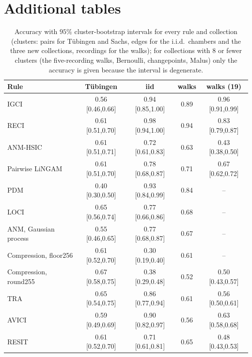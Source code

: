 \section{Additional tables}\label{app:tables}

\begin{table}[ht]
\caption{Accuracy with $95\%$ cluster-bootstrap intervals for every rule and collection (clusters: pairs for T\"ubingen and Sachs, edges for the i.i.d.\ chambers and the three new collections, recordings for the walks); for collections with $8$ or fewer clusters (the five-recording walks, Bernoulli, changepoints, Malus) only the accuracy is given because the interval is degenerate.}
\label{tab:collections_ci}
\scriptsize\setlength{\tabcolsep}{2pt}
\begin{tabular}{@{}lcccc@{}}
\toprule
Rule & T\"ubingen & iid & walks & walks (19)\\
\midrule
IGCI & 0.56 [0.46,0.66] & 0.94 [0.85,1.00] & 0.89 & 0.96 [0.91,0.99]\\
RECI & 0.61 [0.51,0.70] & 0.98 [0.94,1.00] & 0.94 & 0.83 [0.79,0.87]\\
ANM-HSIC & 0.61 [0.51,0.71] & 0.72 [0.61,0.83] & 0.63 & 0.43 [0.38,0.50]\\
Pairwise LiNGAM & 0.61 [0.51,0.70] & 0.78 [0.68,0.87] & 0.71 & 0.67 [0.62,0.72]\\
PDM & 0.40 [0.30,0.50] & 0.93 [0.84,0.99] & 0.84 & --\\
LOCI & 0.65 [0.56,0.74] & 0.77 [0.66,0.86] & 0.68 & --\\
ANM, Gaussian process & 0.55 [0.46,0.65] & 0.77 [0.68,0.87] & 0.67 & --\\
Compression, floor256 & 0.61 [0.52,0.70] & 0.30 [0.19,0.40] & 0.61 & --\\
Compression, round255 & 0.67 [0.58,0.75] & 0.38 [0.29,0.48] & 0.52 & 0.50 [0.43,0.57]\\
TRA & 0.65 [0.54,0.75] & 0.86 [0.77,0.94] & 0.61 & 0.56 [0.50,0.61]\\
AVICI & 0.59 [0.49,0.69] & 0.90 [0.82,0.97] & 0.56 & 0.63 [0.58,0.68]\\
RESIT & 0.61 [0.52,0.70] & 0.71 [0.61,0.81] & 0.65 & 0.48 [0.43,0.53]\\
\bottomrule
\end{tabular}
\medskip


\end{table}
